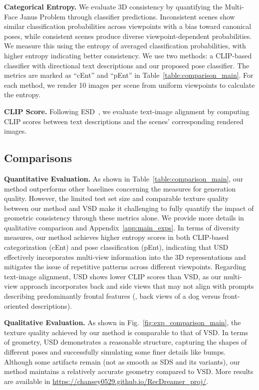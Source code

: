 \textbf{Categorical Entropy.} We evaluate 3D consistency by quantifying the Multi-Face Janus Problem through classifier predictions. Inconsistent scenes show similar classification probabilities across viewpoints with a bias toward canonical poses, while consistent scenes produce diverse viewpoint-dependent probabilities. We measure this using the entropy of averaged classification probabilities, with higher entropy indicating better consistency. We use two methods: a CLIP-based classifier with directional text descriptions and our proposed pose classifier. The metrics are marked as ``cEnt'' and ``pEnt'' in Table~\ref{table:comparison_main}. For each method, we render 10 images per scene from uniform viewpoints to calculate the entropy.

\textbf{CLIP Score.} Following ESD~\citep{wang2024taming}, we evaluate text-image alignment by computing CLIP scores between text descriptions and the scenes' corresponding rendered images.

\subsection{Comparisons}
\textbf{Quantitative Evaluation.} As shown in Table~\ref{table:comparison_main}, our method outperforms other baselines concerning the measures for generation quality. However, the limited test set size and comparable texture quality between our method and VSD make it challenging to fully quantify the impact of geometric consistency through these metrics alone. We provide more details in qualitative comparison and Appendix~\ref{app:main_exps}.
In terms of diversity measures, our method achieves higher entropy scores in both CLIP-based categorization (cEnt) and pose classification (pEnt), indicating that USD effectively incorporates multi-view information into the 3D representations and mitigates the issue of repetitive patterns across different viewpoints.
Regarding text-image alignment, USD shows lower CLIP scores than VSD, as our multi-view approach incorporates back and side views that may not align with prompts describing predominantly frontal features (\eg, back views of a dog versus front-oriented descriptions).



\textbf{Qualitative Evaluation.} As shown in Fig.~\ref{fig:exp_comparison_main}, the texture quality achieved by our method is comparable to that of VSD. In terms of geometry, USD demonstrates a reasonable structure, capturing the shapes of different poses and successfully simulating some finer details like bumps. Although some artifacts remain (not as smooth as SDS and its variants), our method maintains a relatively accurate geometry compared to VSD. More results are available in \url{https://chansey0529.github.io/RecDreamer_proj/}.




